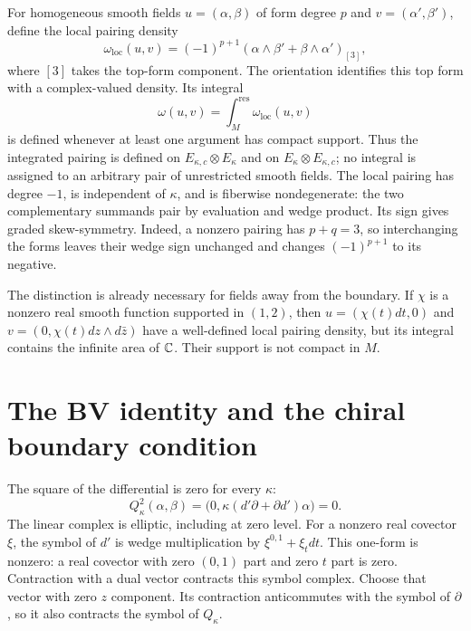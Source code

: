 For homogeneous smooth fields $u=(\alpha,\beta)$ of form degree $p$
and $v=(\alpha',\beta')$, define the local pairing density
\[
 \omega_{\mathrm{loc}}(u,v)=(-1)^{p+1}
       (\alpha\wedge\beta'+\beta\wedge\alpha')_{[3]},
\]
where $[3]$ takes the top-form component.  The orientation identifies
this top form with a complex-valued density.  Its integral
\[
 \omega(u,v)=\int_M^{\mathrm{res}}\omega_{\mathrm{loc}}(u,v)
\]
is defined whenever at least one argument has compact support.
Thus the integrated pairing is defined on
$E_{\kappa,c}\otimes E_\kappa$ and on
$E_\kappa\otimes E_{\kappa,c}$; no integral is assigned to an arbitrary
pair of unrestricted smooth fields.
The local pairing has degree $-1$, is independent of $\kappa$, and is
fiberwise nondegenerate: the two complementary summands pair by
evaluation and wedge product.  Its sign gives graded skew-symmetry.
Indeed, a nonzero pairing has $p+q=3$, so interchanging the forms leaves
their wedge sign unchanged and changes $(-1)^{p+1}$ to its negative.

The distinction is already necessary for fields away from the
boundary.  If $\chi$ is a nonzero real smooth function supported in
$(1,2)$, then $u=(\chi(t)dt,0)$ and
$v=(0,\chi(t)dz\wedge d\bar z)$ have a well-defined local pairing
density, but its integral contains the infinite area of $\mathbb C$.
Their support is not compact in $M$.

\section{The BV identity and the chiral boundary condition}

The square of the differential is zero for every $\kappa$:
\[
 Q_\kappa^2(\alpha,\beta)
 =\bigl(0,\kappa(d'\partial+\partial d')\alpha\bigr)=0.
\]
The linear complex is elliptic, including at zero level.  For a
nonzero real covector $\xi$, the symbol of $d'$ is wedge multiplication
by $\xi^{0,1}+\xi_tdt$.  This one-form is nonzero: a real covector
with zero $(0,1)$ part and zero $t$ part is zero.  Contraction with a
dual vector contracts this symbol complex.  Choose that vector with
zero $z$ component.  Its contraction anticommutes with the symbol of
$\partial$, so it also contracts the symbol of $Q_\kappa$.


